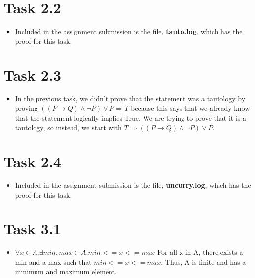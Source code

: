 \documentclass{article}
\newcommand{\answer}{\item[]} %
\begin{document}
	\section{Task 2.2}
		\begin{itemize}
			
			\answer Included in the assignment submission is the file, \textbf{tauto.log}, which has the proof for this task.
			
		\end{itemize}
	
	\section{Task 2.3}
		\begin{itemize}
			
			\answer In the previous task, we didn't prove that the statement was a tautology by proving \newline
			$((P \to Q) \land \neg P) \lor P \Rightarrow T$ because this says that we already know that the statement logically implies True. We are trying to prove that it is a tautology, so instead, we start with $T \Rightarrow ((P \to Q) \land \neg P) \lor P$.
			
		\end{itemize}
	
	\section{Task 2.4}
		\begin{itemize}
			
			\answer Included in the assignment submission is the file, \textbf{uncurry.log}, which has the proof for this task.
			
		\end{itemize}
	
	\pagebreak
	
	\section{Task 3.1}
		\begin{itemize}
			
			\answer $\forall x \in A . \exists min,max \in A . min <= x <= max$
			\newline
			For all x in A, there exists a min and a max such that $min <= x <= max$. Thus, A is finite and has a minimum and maximum element.
			
		\end{itemize}
	
\end{document}
